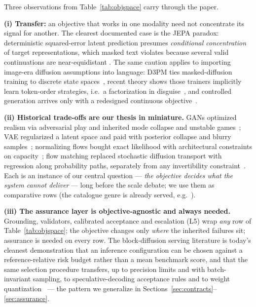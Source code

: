 \documentclass[11pt]{article}
\begin{document}
Three observations from Table~\ref{tab:objspace} carry through the paper.

\textbf{(i) Transfer:} an objective that works in one modality need not
concentrate its signal for another. The clearest documented case is the JEPA paradox: deterministic
squared-error latent prediction presumes \emph{conditional concentration} of target representations,
which masked text violates because several valid continuations are near-equidistant
\cite{klindt2026lejepa,identifiability2026}. The same caution applies to importing image-era
diffusion assumptions into language: D3PM ties masked-diffusion training to discrete state
spaces~\cite{austin2021d3pm}, recent theory shows those trainers implicitly learn token-order
strategies, i.e.\ a factorization in disguise~\cite{mdm2025orderar}, and controlled generation
arrives only with a redesigned continuous objective~\cite{li2022diffusionlm}.

\textbf{(ii) Historical trade-offs are our thesis in miniature.} GANs optimized realism via
adversarial play and inherited mode collapse and unstable games~\cite{goodfellow2014gan,
arjovsky2017wgan,engreports2025modecollapse}; VAE regularized a latent space and paid with posterior
collapse and blurry samples~\cite{kingma2014vae,higgins2017betavae}; normalizing flows bought exact
likelihood with architectural constraints on capacity~\cite{pmlr2021nf}; flow matching replaced
stochastic diffusion transport with regression along probability paths, separately from any
invertibility constraint~\cite{lipman2023flow}. Each is an instance of our central question ---
\emph{the objective decides what the system cannot deliver} --- long before the scale debate; we
use them as comparative rows (the catalogue genre is
already served, e.g.\ \cite{almuammar2026genai,yazdani2025genaidepth}).

\textbf{(iii) The assurance layer is objective-agnostic and always needed.} Grounding, validators,
calibrated acceptance and escalation (L5) wrap \emph{any} row of Table~\ref{tab:objspace}; the
objective changes only \emph{where} the inherited failures sit; assurance is
needed on every row. The
block-diffusion serving literature is today's cleanest demonstration that an inference
configuration can be chosen against a reference-relative risk budget rather than a mean
benchmark score, and that the same selection procedure transfers, up to precision limits and with
batch-invariant sampling, to speculative-decoding acceptance rules and to weight
quantization~\cite{id260933887} --- the
pattern we generalize in Sections~\ref{sec:contracts}--\ref{sec:assurance}.
\end{document}
